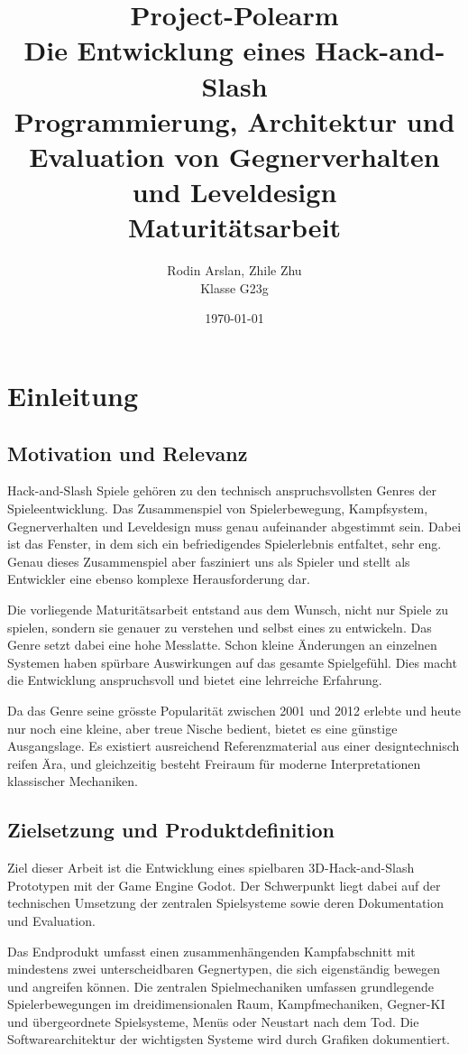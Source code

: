 \documentclass[10pt, a4paper]{article}
\title{
    \textbf{\Huge Project-Polearm} \\ [0.2em]
    \textbf{\Large Die Entwicklung eines Hack-and-Slash} \\ [0.6em]
    \large Programmierung, Architektur und Evaluation von Gegnerverhalten und Leveldesign \\ [0.4em]
    \normalsize Maturitätsarbeit
}
\author{Rodin Arslan, Zhile Zhu \\ \normalsize Klasse G23g}
\date{\today}
\begin{document}
\maketitle
\newpage

\tableofcontents
\newpage

\section{Einleitung}
\subsection{Motivation und Relevanz}

Hack-and-Slash Spiele gehören zu den technisch anspruchsvollsten Genres der Spieleentwicklung. Das Zusammenspiel von Spielerbewegung, Kampfsystem, Gegnerverhalten und Leveldesign muss genau aufeinander abgestimmt sein. Dabei ist das Fenster, in dem sich ein befriedigendes Spielerlebnis entfaltet, sehr eng. Genau dieses Zusammenspiel aber fasziniert uns als Spieler und stellt als Entwickler eine ebenso komplexe Herausforderung dar.

Die vorliegende Maturitätsarbeit entstand aus dem Wunsch, nicht nur Spiele zu spielen, sondern sie genauer zu verstehen und selbst eines zu entwickeln. Das Genre setzt dabei eine hohe Messlatte. Schon kleine Änderungen an einzelnen Systemen haben spürbare Auswirkungen auf das gesamte Spielgefühl. Dies macht die Entwicklung anspruchsvoll und bietet eine lehrreiche Erfahrung.

Da das Genre seine grösste Popularität zwischen 2001 und 2012 erlebte und heute nur noch eine kleine, aber treue Nische bedient, bietet es eine günstige Ausgangslage. Es existiert ausreichend Referenzmaterial aus einer designtechnisch reifen Ära, und gleichzeitig besteht Freiraum für moderne Interpretationen klassischer Mechaniken.

\subsection{Zielsetzung und Produktdefinition}

Ziel dieser Arbeit ist die Entwicklung eines spielbaren 3D-Hack-and-Slash Prototypen mit der Game Engine Godot. Der Schwerpunkt liegt dabei auf der technischen Umsetzung der zentralen Spielsysteme sowie deren Dokumentation und Evaluation.

Das Endprodukt umfasst einen zusammenhängenden Kampfabschnitt mit mindestens zwei unterscheidbaren Gegnertypen, die sich eigenständig bewegen und angreifen können. Die zentralen Spielmechaniken umfassen grundlegende Spielerbewegungen im dreidimensionalen Raum, Kampfmechaniken, Gegner-KI und übergeordnete Spielsysteme, Menüs oder Neustart nach dem Tod. Die Softwarearchitektur der wichtigsten Systeme wird durch Grafiken dokumentiert.
\end{document}
